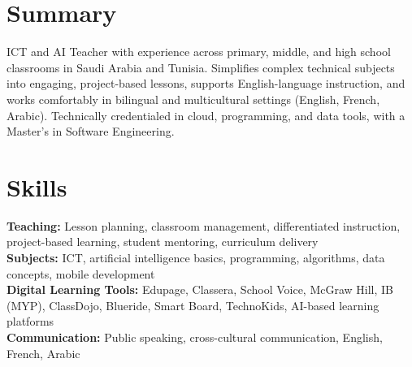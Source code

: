 \documentclass[a4paper,10pt]{article}
\begin{document}

\section*{Summary}
ICT and AI Teacher with experience across primary, middle, and high school classrooms in Saudi Arabia and Tunisia. Simplifies complex technical subjects into engaging, project-based lessons, supports English-language instruction, and works comfortably in bilingual and multicultural settings (English, French, Arabic). Technically credentialed in cloud, programming, and data tools, with a Master's in Software Engineering.

\section*{Skills}
\textbf{Teaching:} Lesson planning, classroom management, differentiated instruction, project-based learning, student mentoring, curriculum delivery\\
\textbf{Subjects:} ICT, artificial intelligence basics, programming, algorithms, data concepts, mobile development\\
\textbf{Digital Learning Tools:} Edupage, Classera, School Voice, McGraw Hill, IB (MYP), ClassDojo, Blueride, Smart Board, TechnoKids, AI-based learning platforms\\
\textbf{Communication:} Public speaking, cross-cultural communication, English, French, Arabic
\end{document}
